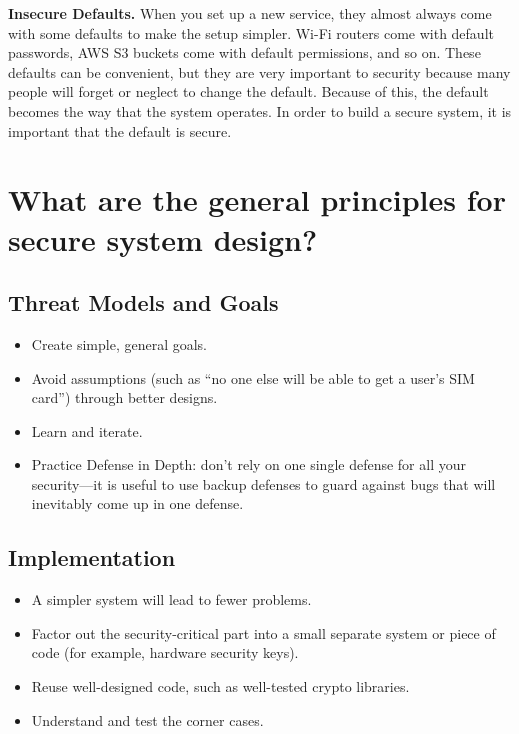 \documentclass[
  letterpaper,
]{scrbook}
\providecommand{\tightlist}{%
  \setlength{\itemsep}{0pt}\setlength{\parskip}{0pt}}
\theoremstyle{definition}
\theoremstyle{plain}
\theoremstyle{plain}
\theoremstyle{remark}
\begin{document}
\textbf{Insecure Defaults.} When you set up a new service, they almost
always come with some defaults to make the setup simpler. Wi-Fi routers
come with default passwords, AWS S3 buckets come with default
permissions, and so on. These defaults can be convenient, but they are
very important to security because many people will forget or neglect to
change the default. Because of this, the default becomes the way that
the system operates. In order to build a secure system, it is important
that the default is secure.

\section{What are the general principles for secure system
design?}\label{what-are-the-general-principles-for-secure-system-design}

\subsection{Threat Models and Goals}\label{threat-models-and-goals}

\begin{itemize}
\tightlist
\item
  Create simple, general goals.
\item
  Avoid assumptions (such as ``no one else will be able to get a user's
  SIM card'') through better designs.
\item
  Learn and iterate.
\item
  Practice Defense in Depth: don't rely on one single defense for all
  your security---it is useful to use backup defenses to guard against
  bugs that will inevitably come up in one defense.
\end{itemize}

\subsection{Implementation}\label{implementation}

\begin{itemize}
\tightlist
\item
  A simpler system will lead to fewer problems.
\item
  Factor out the security-critical part into a small separate system or
  piece of code (for example, hardware security keys).
\item
  Reuse well-designed code, such as well-tested crypto libraries.
\item
  Understand and test the corner cases.
\end{itemize}
\end{document}
